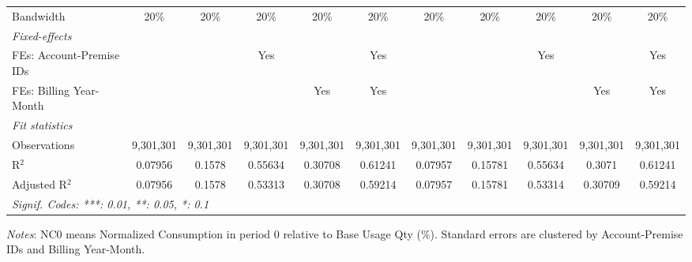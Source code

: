 \begin{table}[htbp]
\begin{adjustbox}{scale = 0.75}
\begin{tabular}{lcccccccccc}
& & & & & & & & & & \\
\midrule Bandwidth & 20\% & 20\% & 20\% & 20\% & 20\% & 20\% & 20\% & 20\% & 20\% & 20\%\\
\midrule
\emph{Fixed-effects}&   &   &   &   &   &   &   &   &   &  \\
FEs: Account-Premise IDs &  &  & Yes &  & Yes &  &  & Yes &  & Yes\\
FEs: Billing Year-Month &  &  &  & Yes & Yes &  &  &  & Yes & Yes\\
\midrule
\emph{Fit statistics}&  & & & & & & & & & \\
Observations & 9,301,301&9,301,301&9,301,301&9,301,301&9,301,301&9,301,301&9,301,301&9,301,301&9,301,301&9,301,301\\
R$^2$ & 0.07956&0.1578&0.55634&0.30708&0.61241&0.07957&0.15781&0.55634&0.3071&0.61241\\
Adjusted R$^2$ & 0.07956&0.1578&0.53313&0.30708&0.59214&0.07957&0.15781&0.53314&0.30709&0.59214\\
\bottomrule\bottomrule
\multicolumn{11}{l}{\emph{Signif. Codes: ***: 0.01, **: 0.05, *: 0.1}}\\
\end{tabular}
\end{adjustbox}
\begin{tablenotes}
\footnotesize
\emph{\medskip Notes}: NC0 means Normalized Consumption in period 0 relative to Base Usage Qty (\%). Standard errors are clustered by Account-Premise IDs and Billing Year-Month.
\end{tablenotes}
\end{table}